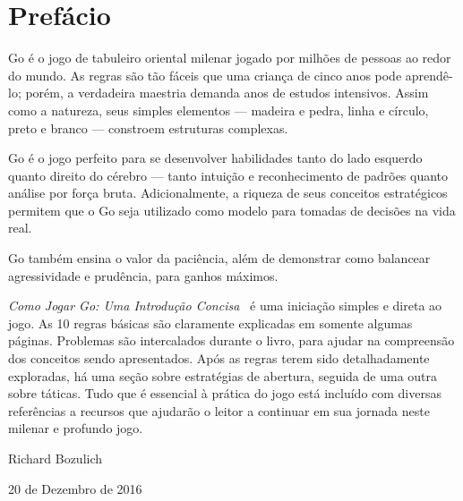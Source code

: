 \chapter{Prefácio}

Go é o jogo de tabuleiro oriental milenar jogado por milhões de pessoas ao redor do mundo. As regras são tão fáceis que uma criança de cinco anos pode aprendê-lo; porém, a verdadeira maestria demanda anos de estudos intensivos. Assim como a natureza, seus simples elementos --- madeira e pedra, linha e círculo, preto e branco --- constroem estruturas complexas.

Go é o jogo perfeito para se desenvolver habilidades tanto do lado esquerdo quanto direito do cérebro --- tanto intuição e reconhecimento de padrões quanto análise por força bruta. Adicionalmente, a riqueza de seus conceitos estratégicos permitem que o Go seja utilizado como modelo para tomadas de decisões na vida real.

Go também ensina o valor da paciência, além de demonstrar como balancear agressividade e prudência, para ganhos máximos.

\bigskip

\emph{Como Jogar Go: Uma Introdução Concisa}~\cite{bozulich_how_to_play_go} é uma iniciação simples e direta ao jogo. As 10 regras básicas são claramente explicadas em somente algumas páginas. Problemas são intercalados durante o livro, para ajudar na compreensão dos conceitos sendo apresentados. Após as regras terem sido detalhadamente exploradas, há uma seção sobre estratégias de abertura, seguida de uma outra sobre táticas. Tudo que é essencial à prática do jogo está incluído com diversas referências a recursos que ajudarão o leitor a continuar em sua jornada neste milenar e profundo jogo.

\bigskip
\bigskip

Richard Bozulich

20 de Dezembro de 2016